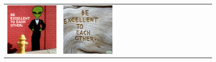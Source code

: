 \begin{figure}[ht!]
\begin{adjustwidth}{-0.8in}{-0.5in}
\begin{tabular}{cccccccccccccccccccc}
\multicolumn{3}{c}{\includegraphics[width=\twobytwocolwidth\textwidth]{figures/cherries/excellent_alien.jpg}} &
\multicolumn{3}{c}{\includegraphics[width=\twobytwocolwidth\textwidth]{figures/cherries/excellent_wood.jpg}} \\


\end{tabular}
\end{adjustwidth}
\end{figure}
